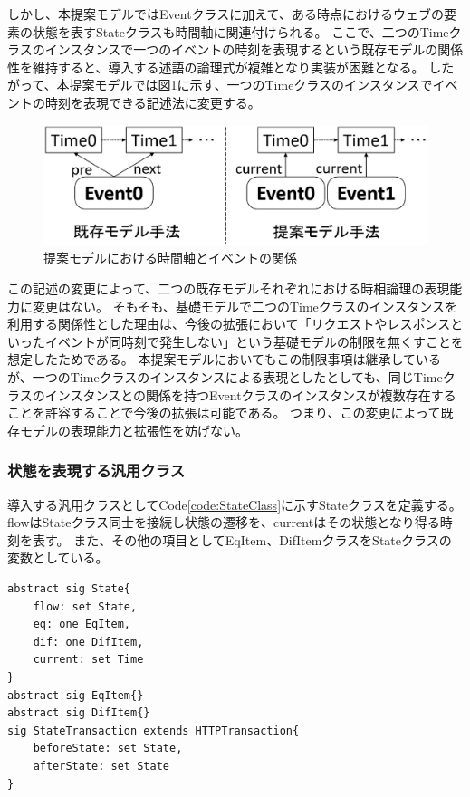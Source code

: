 \documentclass[12pt,a4paper]{jbook}
\begin{document}
しかし、本提案モデルではEventクラスに加えて、ある時点におけるウェブの要素の状態を表すStateクラスも時間軸に関連付けられる。
ここで、二つのTimeクラスのインスタンスで一つのイベントの時刻を表現するという既存モデルの関係性を維持すると、導入する述語の論理式が複雑となり実装が困難となる。
したがって、本提案モデルでは図\ref{fig:ProposedModel-TimeClass}に示す、一つのTimeクラスのインスタンスでイベントの時刻を表現できる記述法に変更する。

\begin{figure}[htb]
\centering
\includegraphics[width=450pt]{./fig/ProposedModel-TimeClass.eps}
\caption{提案モデルにおける時間軸とイベントの関係}
\label{fig:ProposedModel-TimeClass}
\end{figure}

この記述の変更によって、二つの既存モデルそれぞれにおける時相論理の表現能力に変更はない。
そもそも、基礎モデルで二つのTimeクラスのインスタンスを利用する関係性とした理由は、今後の拡張において「リクエストやレスポンスといったイベントが同時刻で発生しない」という基礎モデルの制限を無くすことを想定したためである。
本提案モデルにおいてもこの制限事項は継承しているが、一つのTimeクラスのインスタンスによる表現としたとしても、同じTimeクラスのインスタンスとの関係を持つEventクラスのインスタンスが複数存在することを許容することで今後の拡張は可能である。
つまり、この変更によって既存モデルの表現能力と拡張性を妨げない。

\subsubsection{状態を表現する汎用クラス}
導入する汎用クラスとしてCode\ref{code:StateClass}に示すStateクラスを定義する。
flowはStateクラス同士を接続し状態の遷移を、currentはその状態となり得る時刻を表す。
また、その他の項目としてEqItem、DifItemクラスをStateクラスの変数としている。
\begin{lstlisting}[caption=Stateクラス, label=code:StateClass]
abstract sig State{
	flow: set State,
	eq: one EqItem,
	dif: one DifItem,
	current: set Time
}
abstract sig EqItem{}
abstract sig DifItem{}
sig StateTransaction extends HTTPTransaction{
	beforeState: set State,
	afterState: set State
}
\end{lstlisting}
\end{document}
